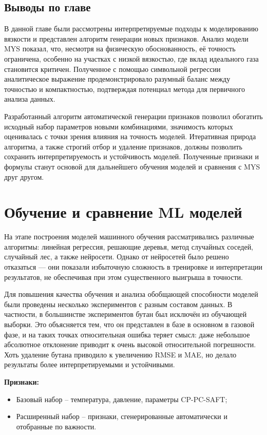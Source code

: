 \documentclass[a4paper,12pt]{article}
\begin{document}
  \subsection{Выводы по главе}

    В данной главе были рассмотрены интерпретируемые подходы к моделированию вязкости и представлен алгоритм генерации новых признаков. Анализ модели MYS показал, что, несмотря на физическую обоснованность, её точность ограничена, особенно на участках с низкой вязкостью, где вклад идеального газа становится критичен. Полученное с помощью символьной регрессии аналитическое выражение продемонстрировало разумный баланс между точностью и компактностью, подтверждая потенциал метода для первичного анализа данных.
    
    Разработанный алгоритм автоматической генерации признаков позволил обогатить исходный набор параметров новыми комбинациями, значимость которых оценивалась с точки зрения влияния на точность моделей. Итеративная природа алгоритма, а также строгий отбор и удаление признаков, должны позволить сохранить интерпретируемость и устойчивость моделей. Полученные признаки и формулы станут основой для дальнейшего обучения моделей и сравнения с MYS друг другом.

\section{Обучение и сравнение ML моделей}

  На этапе построения моделей машинного обучения рассматривались различные алгоритмы: линейная регрессия, решающие деревья, метод случайных соседей, случайный лес, а также нейросети. Однако от нейросетей было решено отказаться — они показали избыточную сложность в тренировке и интерпретации результатов, не обеспечивая при этом существенного выигрыша в точности.
  
  Для повышения качества обучения и анализа обобщающей способности моделей были проведены несколько экспериментов с разным составом данных. В частности, в большинстве экспериментов бутан был исключён из обучающей выборки. Это объясняется тем, что он представлен в базе в основном в газовой фазе, и на таких точках относительная ошибка теряет смысл: даже небольшое абсолютное отклонение приводит к очень высокой относительной погрешности. Хоть удаление бутана приводило к увеличению RMSE и MAE, но делало результаты более интерпретируемыми и устойчивыми.
  
  \begin{minipage}{\textwidth}
    \textbf{Признаки:}
    \begin{itemize}
      \item Базовый набор -- температура, давление, параметры CP-PC-SAFT;
      \item Расширенный набор -- признаки, сгенерированные автоматически и отобранные по важности.
    \end{itemize}
  \end{minipage}
  
\end{document}
